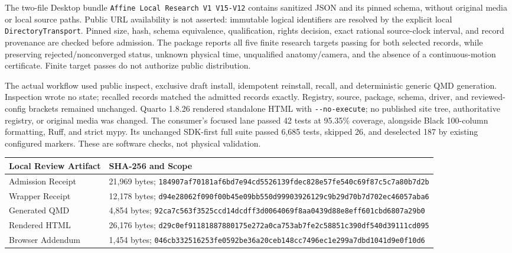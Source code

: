 \documentclass[11pt,letterpaper]{article}
\newcommand{\code}[1]{\nolinkurl{#1}}
\newcommand{\hash}[1]{{\footnotesize\nolinkurl{#1}}}
\begin{document}
The two-file Desktop bundle \code{Affine Local Research V1 V15-V12} contains
sanitized JSON and its pinned schema, without original media or local source
paths. Public URL availability is not asserted: immutable logical identifiers
are resolved by the explicit local \code{DirectoryTransport}. Pinned size,
hash, schema equivalence, qualification, rights decision, exact rational
source-clock interval, and record provenance are checked before admission.
The package reports all five finite research targets passing for both selected
records, while preserving rejected/nonconverged status, unknown physical time,
unqualified anatomy/camera, and the absence of a continuous-motion certificate.
Finite target passes do not authorize public distribution.

The actual workflow used public inspect, exclusive draft install, idempotent
reinstall, recall, and deterministic generic QMD generation. Inspection wrote
no state; recalled records matched the admitted records exactly. Registry,
source, package, schema, driver, and reviewed-config brackets remained
unchanged. Quarto 1.8.26 rendered standalone HTML with \code{--no-execute};
no published site tree, authoritative registry, or original media was changed.
The consumer's focused lane passed 42 tests at 95.35\% coverage, alongside
Black 100-column formatting, Ruff, and strict mypy. Its unchanged SDK-first
full suite passed 6,685 tests, skipped 26, and deselected 187 by existing
configured markers. These are software checks, not physical validation.

\begin{longtable}{@{}p{1.3in}p{5in}@{}}
\toprule Local Review Artifact & SHA-256 and Scope\\\midrule\endhead
Admission Receipt & 21,969 bytes;
\hash{184907af70181af6bd7e94cd5526139fdec828e57fe540c69f87c5c7a80b7d2b}\\
Wrapper Receipt & 12,178 bytes;
\hash{d94e28062f090f00b45e09bb550d99903926129c9b29d70b7d702ec46057aba6}\\
Generated QMD & 4,854 bytes;
\hash{92ca7c563f3525ccd14dcdff3d0064069f8aa0439d88e8eff601cbd6807a29b0}\\
Rendered HTML & 26,176 bytes;
\hash{d29c0ef91181887880175e272a0ca753ab7fe2c58851c390df540d39111cd095}\\
Browser Addendum & 1,454 bytes;
\hash{046cb332516253fe0592be36a20ceb148cc7496ec1e299a7dbd1041d9e0f10d6}\\
\bottomrule
\end{longtable}
\end{document}
